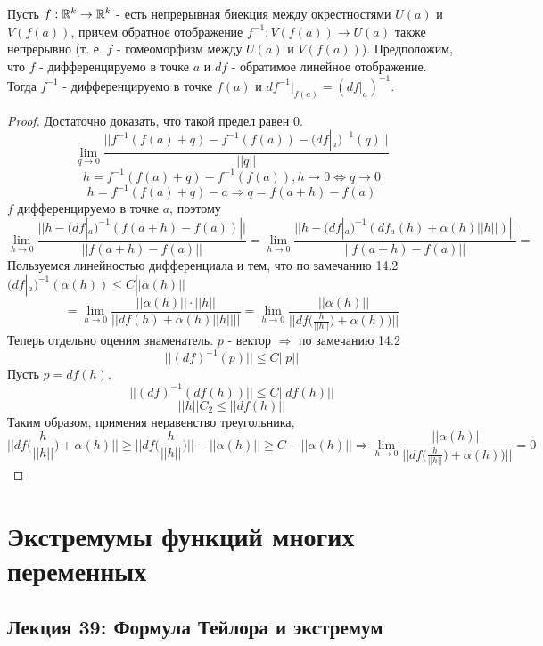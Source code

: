     \begin{theorem}
    	Пусть $f : \mathbb R^k \rightarrow \mathbb R^k$ - есть непрерывная биекция между окрестностями $U(a)$ и $V(f(a))$, причем обратное отображение $f^{-1} : V (f(a)) \rightarrow U(a)$ также непрерывно (т. е. $f$ -	гомеоморфизм между $U(a)$ и $V(f(a))$). Предположим, что $f$ - дифференцируемо в точке $a$ и $df$ - обратимое линейное
    	отображение. Тогда $f^{-1}$ - дифференцируемо в точке $f(a)$ и $df^{-1}|_{f(a)}	= (df|_a)^{-1}$.
    \end{theorem}
    
    \begin{proof}
    	Достаточно доказать, что такой предел равен 0.
    	\[ \lim_{q \to 0} \frac{||f^{-1}(f(a) + q) - f^{-1}(f(a)) - (df|_a)^{-1}(q)||}{||q||} \]
    	\[ h = f^{-1}(f(a) + q) - f^{-1}(f(a)), h \to 0 \Leftrightarrow q \to 0 \]
    	\[ h = f^{-1}(f(a) + q) - a \Rightarrow q = f(a + h) - f(a) \]
    	$f$ дифференцируемо в точке $a$, поэтому
    	\[ \lim_{h \to 0} \frac{||h - (df|_a)^{-1}(f(a + h) - f(a))||}{||f(a + h) - f(a)||} = \lim_{h \to 0} \frac{||h - (df|_a)^{-1}(df_a(h) + \alpha(h)||h||)||}{||f(a + h) - f(a)||} = \]
    	Пользуемся линейностью дифференциала и тем, что по замечанию 14.2 $(df|_a)^{-1}(\alpha(h)) \leqslant C||\alpha(h)||$
    	\[ = \lim_{h \to 0} \frac{||\alpha(h)|| \cdot ||h||}{||df(h) + \alpha(h)||h||||} = \lim_{h \to 0} \frac{||\alpha(h)||}{||df\big(\frac{h}{||h||}\big) + \alpha(h))||} \]
    	Теперь отдельно оценим знаменатель. $p$ - вектор $\Rightarrow$ по замечанию 14.2
    	\[ ||(df)^{-1}(p)|| \leqslant C ||p|| \]
    	Пусть $p = df(h)$.
    	\[ ||(df)^{-1}(df(h))|| \leqslant C||df(h)|| \]
    	\[ ||h|| C_2 \leqslant ||df(h)|| \]
    	Таким образом, применяя неравенство треугольника,
    	\[ ||df\bigg(\frac{h}{||h||}\bigg) + \alpha(h)|| \geqslant ||df\bigg(\frac{h}{||h||}\bigg)|| - ||\alpha(h)|| \geqslant C - ||\alpha(h)|| \Rightarrow \lim_{h \to 0} \frac{||\alpha(h)||}{||df\big(\frac{h}{||h||}\big) + \alpha(h))||} = 0 \]
    \end{proof}
    
    \newpage
    
    \chapter{Экстремумы функций многих переменных}
    
    \section*{Лекция 39: Формула Тейлора и экстремум}
    
